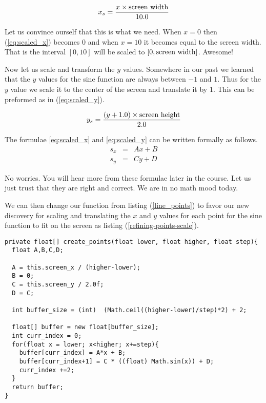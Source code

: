 \documentclass[11pt,a4paper]{article}
\begin{document}
\begin{equation}\label{eq:scaled_x}
x_s = \frac{x \times \textnormal{screen width}}{10.0} 
\end{equation}

Let us convince ourself that this is what we need. When $x=0$ then
(\ref{eq:scaled_x}) becomes 0 and when $x=10$ it becomes equal to the screen
width. That is the interval $[0,10]$ will be scaled to $[0, \textnormal{screen width}]$.
Awesome!

Now let us scale and transform the $y$ values. Somewhere in our past we
learned that the $y$ values for the sine function are always between $-1$ and
$1$. Thus for the $y$ value we scale it to the center of the screen and
translate it by $1$. This can be preformed as in (\ref{eq:scaled_y}).

\begin{equation}\label{eq:scaled_y}
y_s = \frac{(y +1.0) \times \textnormal{screen height}}
           {\textnormal{2.0}}
\end{equation}

The formulae \ref{eq:scaled_x} and \ref{eq:scaled_y} can be written formally as follows.
\begin{eqnarray}
s_x &=& Ax + B\\
s_y &=& Cy + D
\end{eqnarray}

No worries. You will hear more from these formulae later in the course. Let us
just trust that they are right and correct. We are in no math mood today.

We can then change our function from listing (\ref{line_points}) to favor our
new discovery for scaling and translating the $x$ and $y$ values for each point
for the sine function to fit on the screen as listing (\ref{refining-points-scale}).

\begin{lstlisting}[caption=Creating vertex buffer for the sine function using scaling and transformation, label=refining-points-scale]
private float[] create_points(float lower, float higher, float step){
  float A,B,C,D;

  A = this.screen_x / (higher-lower);
  B = 0;
  C = this.screen_y / 2.0f;
  D = C;

  int buffer_size = (int)  (Math.ceil((higher-lower)/step)*2) + 2;

  float[] buffer = new float[buffer_size];
  int curr_index = 0;
  for(float x = lower; x<higher; x+=step){
	buffer[curr_index] = A*x + B;
	buffer[curr_index+1] = C * ((float) Math.sin(x)) + D;
	curr_index +=2;
  }
  return buffer;
}
\end{lstlisting}
\end{document}
